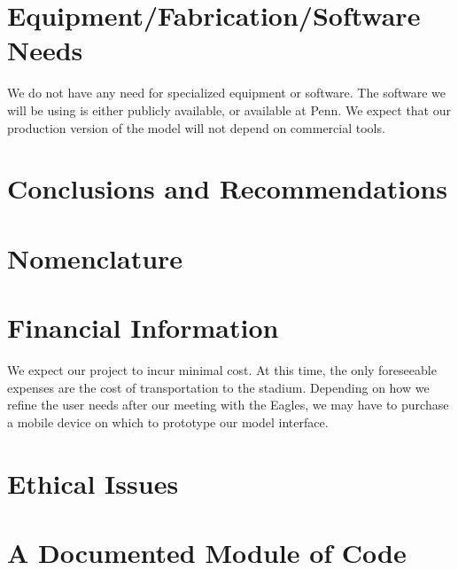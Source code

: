 \documentclass[12pt]{article}
\begin{document}
\section{Equipment/Fabrication/Software Needs}
We do not have any need for specialized equipment or software. The
software we will be using is either publicly available, or available
at Penn. We expect that our production version of the model will not
depend on commercial tools.

\section{Conclusions and Recommendations}



\section{Nomenclature}



\makereferences

\makebibliography


\section{Financial Information}
We expect our project to incur minimal cost. At this time, the only
foreseeable expenses are the cost of transportation to the
stadium. Depending on how we refine the user needs after our meeting
with the Eagles, we may have to purchase a mobile device on which to
prototype our model interface.

\section{Ethical Issues}



\appendix

\section{A Documented Module of Code}

\end{document}
